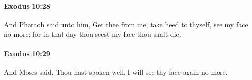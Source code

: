 		\paragraph{Exodus 10:28} %
			\label{EXODUS-10-28}

			And Pharaoh said unto him, Get thee from me, take heed to thyself, see my face no more; for in that day thou seest my face thou shalt die.


		\paragraph{Exodus 10:29} %
			\label{EXODUS-10-29}

			And Moses said, Thou hast spoken well, I will see thy face again no more.

